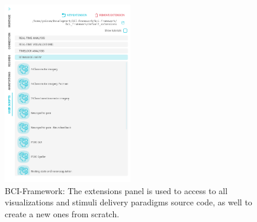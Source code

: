 \begin{figure}
\begin{centering}
\includegraphics[width=0.5\textwidth]{Cap4/Figures/development_environment_extensions.png}
\par\end{centering}
\caption[BCI-Framework: Extensions panel]{BCI-Framework: The extensions panel is used to access to all visualizations and stimuli delivery paradigms source code, as well to create a new ones from scratch. }
\label{fig:development_environment_extension}
\end{figure}